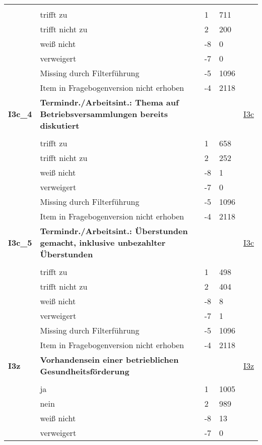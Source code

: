 \begin{longtable}{| L{2.5cm} | L{8.25cm}| C{1.5cm} | R{1.25cm} | C{2.25cm} |  }
   &  &  &  &  \\ 
   & trifft zu & 1 & 711 &  \\ 
   & trifft nicht zu & 2 & 200 &  \\ 
   & weiß nicht & -8 & 0 &  \\ 
   & verweigert & -7 & 0 &  \\ 
   & Missing durch Filterführung & -5 & 1096 &  \\ 
   & Item in Fragebogenversion nicht erhoben & -4 & 2118 &  \\ 
   \midrule
\textbf{I3c\_4}\label{var:suf:I3c:4} & \textbf{Termindr./Arbeitsint.: Thema auf Betriebsversammlungen bereits diskutiert} &  &  & \hyperref[I3c]{I3c} \\ 
   &  &  &  &  \\ 
   & trifft zu & 1 & 658 &  \\ 
   & trifft nicht zu & 2 & 252 &  \\ 
   & weiß nicht & -8 & 1 &  \\ 
   & verweigert & -7 & 0 &  \\ 
   & Missing durch Filterführung & -5 & 1096 &  \\ 
   & Item in Fragebogenversion nicht erhoben & -4 & 2118 &  \\ 
   \midrule
\textbf{I3c\_5}\label{var:suf:I3c:5} & \textbf{Termindr./Arbeitsint.: Überstunden gemacht, inklusive unbezahlter Überstunden} &  &  & \hyperref[I3c]{I3c} \\ 
   &  &  &  &  \\ 
   & trifft zu & 1 & 498 &  \\ 
   & trifft nicht zu & 2 & 404 &  \\ 
   & weiß nicht & -8 & 8 &  \\ 
   & verweigert & -7 & 1 &  \\ 
   & Missing durch Filterführung & -5 & 1096 &  \\ 
   & Item in Fragebogenversion nicht erhoben & -4 & 2118 &  \\ 
   \midrule
\textbf{I3z}\label{var:suf:I3z} & \textbf{Vorhandensein einer betrieblichen Gesundheitsförderung} &  &  & \hyperref[I3z]{I3z} \\ 
   &  &  &  &  \\ 
   & ja & 1 & 1005 &  \\ 
   & nein & 2 & 989 &  \\ 
   & weiß nicht & -8 & 13 &  \\ 
   & verweigert & -7 & 0 &  \\ 

\end{longtable}
